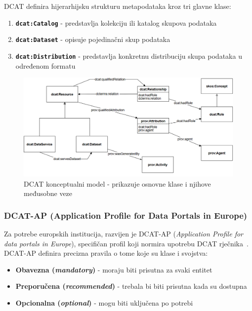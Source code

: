 DCAT definira hijerarhijsku strukturu metapodataka kroz tri glavne klase:

\begin{enumerate}
    \item \textbf{\texttt{dcat:Catalog}} - predstavlja kolekciju ili katalog skupova podataka
    \item \textbf{\texttt{dcat:Dataset}} - opisuje pojedinačni skup podataka
    \item \textbf{\texttt{dcat:Distribution}} - predstavlja konkretnu distribuciju skupa podataka u određenom formatu
\end{enumerate}

\begin{figure}[htbp]
    \centering
    \includegraphics[width=1\textwidth]{figures/dcat.png}
    \caption{DCAT konceptualni model - prikazuje osnovne klase i njihove međusobne veze}
    \label{fig:dcat_conceptual_model}
\end{figure}

\subsubsection{DCAT-AP (Application Profile for Data Portals in Europe)}

Za potrebe europskih institucija, razvijen je DCAT-AP (\textit{Application Profile for data portals in Europe}), specifičan profil koji normira upotrebu DCAT rječnika~\cite{dcatap2020}. DCAT-AP definira precizna pravila o tome koje su klase i svojstva:

\begin{itemize}
    \item \textbf{Obavezna (\textit{mandatory})} - moraju biti prisutna za svaki entitet
    \item \textbf{Preporučena (\textit{recommended})} - trebala bi biti prisutna kada su dostupna
    \item \textbf{Opcionalna (\textit{optional})} - mogu biti uključena po potrebi
\end{itemize}

